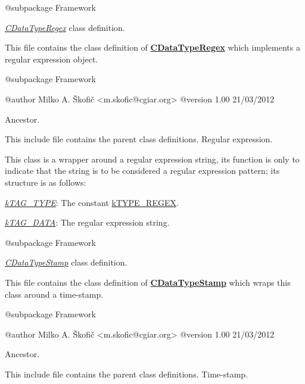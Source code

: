 \begin{DoxyVerb} @subpackage        Framework\end{DoxyVerb}


{\itshape \hyperlink{class_c_data_type_regex}{C\-Data\-Type\-Regex}} class definition.

This file contains the class definition of {\bfseries \hyperlink{class_c_data_type_regex}{C\-Data\-Type\-Regex}} which implements a regular expression object.

\begin{DoxyVerb} @subpackage        Framework

 @author            Milko A. Škofič <m.skofic@cgiar.org>
 @version   1.00 21/03/2012\end{DoxyVerb}


Ancestor.

This include file contains the parent class definitions. Regular expression.

This class is a wrapper around a regular expression string, its function is only to indicate that the string is to be considered a regular expression pattern; its structure is as follows\-:


\begin{DoxyItemize}
\item {\itshape \hyperlink{}{k\-T\-A\-G\-\_\-\-T\-Y\-P\-E}}\-: The constant \hyperlink{}{k\-T\-Y\-P\-E\-\_\-\-R\-E\-G\-E\-X}. 
\item {\itshape \hyperlink{}{k\-T\-A\-G\-\_\-\-D\-A\-T\-A}}\-: The regular expression string. 
\end{DoxyItemize}

\begin{DoxyVerb} @subpackage        Framework\end{DoxyVerb}


{\itshape \hyperlink{class_c_data_type_stamp}{C\-Data\-Type\-Stamp}} class definition.

This file contains the class definition of {\bfseries \hyperlink{class_c_data_type_stamp}{C\-Data\-Type\-Stamp}} which wraps this class around a time-\/stamp.

\begin{DoxyVerb} @subpackage        Framework

 @author            Milko A. Škofič <m.skofic@cgiar.org>
 @version   1.00 21/03/2012\end{DoxyVerb}


Ancestor.

This include file contains the parent class definitions. Time-\/stamp.

